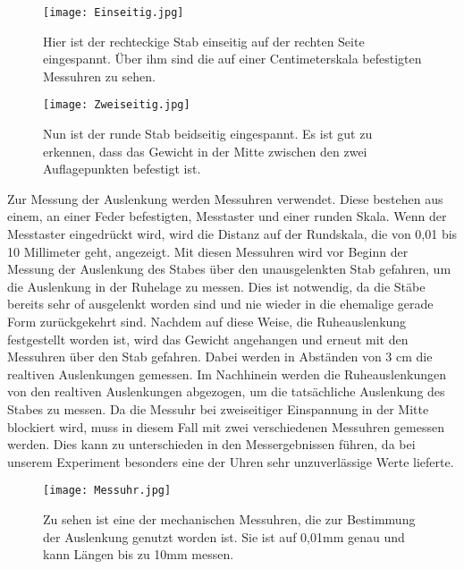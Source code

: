 \documentclass[titlepage = firstcover]{scrartcl}
\begin{document}
    \begin{figure}[h]
      \centering
      \texttt{[image: Einseitig.jpg]}
      \caption{Hier ist der rechteckige Stab einseitig auf der rechten Seite eingespannt. Über ihm sind die auf einer Centimeterskala befestigten Messuhren zu sehen.}
    \end{figure}
    \newpage
    \begin{figure}[h]
      \centering
      \texttt{[image: Zweiseitig.jpg]}
      \caption{Nun ist der runde Stab beidseitig eingespannt. Es ist gut zu erkennen, dass das Gewicht in der Mitte zwischen den zwei Auflagepunkten befestigt ist. }
    \end{figure}
    Zur Messung der Auslenkung werden Messuhren verwendet. Diese bestehen aus einem, an einer Feder befestigten, Messtaster und einer runden Skala. Wenn der 
    Messtaster eingedrückt wird, wird die Distanz auf der Rundskala, die von 0,01 bis 10 Millimeter geht, angezeigt. Mit diesen Messuhren wird vor Beginn der
    Messung der Auslenkung des Stabes über den unausgelenkten Stab gefahren, um die Auslenkung in der Ruhelage zu messen. Dies ist notwendig, da die Stäbe 
    bereits sehr of ausgelenkt worden sind und nie wieder in die ehemalige gerade Form zurückgekehrt sind. Nachdem auf diese Weise, die Ruheauslenkung 
    festgestellt worden ist, wird das Gewicht angehangen und erneut mit den Messuhren über den Stab gefahren. Dabei werden in Abständen von 3 cm die realtiven 
    Auslenkungen gemessen. Im Nachhinein werden die Ruheauslenkungen von den realtiven Auslenkungen abgezogen, um die tatsächliche Auslenkung des Stabes zu
    messen. Da die Messuhr bei zweiseitiger Einspannung in der Mitte blockiert wird, muss in diesem Fall mit zwei verschiedenen Messuhren gemessen werden. Dies
    kann zu unterschieden in den Messergebnissen führen, da bei unserem Experiment besonders eine der Uhren sehr unzuverlässige Werte lieferte.
    \begin{figure}[h]
      \centering
      \texttt{[image: Messuhr.jpg]}
      \caption{Zu sehen ist eine der mechanischen Messuhren, die zur Bestimmung der Auslenkung genutzt worden ist. Sie ist auf 0,01mm genau und kann Längen bis zu 10mm messen.}
    \end{figure}   

  
\end{document}
